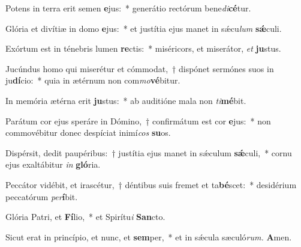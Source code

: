 \item Potens in terra erit semen \textbf{e}jus:~* generátio rectórum bene\tinyhspace\textit{di}\textbf{cé}tur.
\item Glória et divítiæ in domo \textbf{e}jus:~* et justítia ejus manet in sǽcu\tinyhspace\textit{lum} \textbf{sǽ}culi.
\item Exórtum est in ténebris lumen \textbf{re}ctis:~* miséricors, et miserátor, \textit{et} \textbf{ju}stus.
\item Jucúndus homo qui miserétur et cómmodat,~† dispónet sermónes suos in ju\textbf{dí}cio:~* quia in ætérnum non com\textit{mo}\textbf{vé}bitur.
\item In memória ætérna erit \textbf{ju}stus:~* ab auditióne mala non \textit{ti}\textbf{mé}bit.
\item Parátum cor ejus speráre in Dómino,~† confirmátum est cor \textbf{e}jus:~* non commovébitur donec despíciat inimí\teenyhspace\textit{cos} \textbf{su}os.
\item Dispérsit, dedit paupéribus:~† justítia ejus manet in sǽculum \textbf{sǽ}culi,~* cornu ejus exaltábitur \textit{in} \textbf{gló}ria.
\item Peccátor vidébit, et irascétur,~† déntibus suis fremet et ta\textbf{bé}scet:~* desidérium peccatórum \textit{per}\textbf{í}bit.
\item Glória Patri, et \textbf{Fí}lio,~* et Spirítu\textit{i} \textbf{San}cto.
\item Sicut erat in princípio, et nunc, et \textbf{sem}per,~* et in sǽcula sæculó\textit{rum.} \textbf{A}men.
